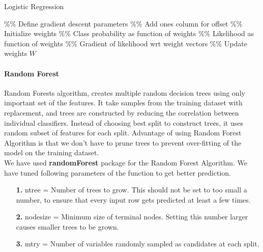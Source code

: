 \documentclass[fleqn,10pt]{SelfArx} %
\begin{document}
\begin{algorithm}
	\caption{Logistic Regression}
	\label{alg:1}
	\begin{algorithmic}[1]
		\STATE \%\% Define gradient descent parameters
		\STATE \%\% Add ones column for offset
		\STATE \%\% Initialize weights
		\STATE \%\% Class probability as function of weights
		\STATE \%\% Likelihood as function of weights
		\STATE \%\% Gradient of likelihood wrt weight vectors
		\STATE \%\% Update weights
		\ENDWHILE
		\RETURN $W$
	\end{algorithmic}
\end{algorithm}

\paragraph{Random Forest}
Random Forests algorithm, creates multiple random decision trees using only important set of the features. It take samples from the training dataset with replacement, and trees are constructed by reducing the correlation between individual classifiers. Instead of choosing best split to construct trees, it uses random subset of features for each split. Advantage of using Random Forest Algorithm is that we don't have to prune trees to prevent over-fitting of the model on the training dataset.\\
We have used \textbf{randomForest} package for the Random Forest Algorithm. We have tuned following parameters of the function to get better prediction.
\begin{enumerate}
	\item[\textbf{1.}] ntree = Number of trees to grow. This should not be set to too small a number, to ensure that every input row gets predicted at least a few times.\\
	\item[\textbf{2.}] nodesize = Minimum size of terminal nodes. Setting this number larger causes smaller trees to be grown.\\ 
	\item[\textbf{3.}] mtry = Number of variables randomly sampled as candidates at each split.\\
\end{enumerate}
 
\end{document}
